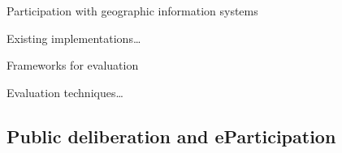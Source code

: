 Participation with geographic information systems   \cite{Longueville2010_community_based_geoportals_web20} \cite{Rinner2009_Web2_argumap}  \cite{Simao2009Webbased}


Existing implementations\dots \cite{Rinner2007_geovis_decisionsupport} \cite{Boroushaki2010_ParticipatoryGIS} \cite{Kessler2005_Conflict_Resolution} \cite{Meng2010_ArgooMap_evaluation} \cite{Meng2010_WebPPGIS_Usability} \cite{Sani2011_Scalable_Argumap}


Frameworks for evaluation \cite{Walker2013Qualitative}

Evaluation techniques\dots 


\subsection{Public deliberation and eParticipation}

